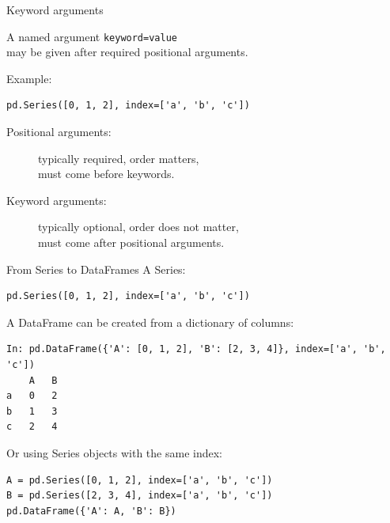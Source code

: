 \documentclass[aspectratio=169,usenames,dvipsnames]{beamer}
\begin{document}
\begin{frame}[fragile]{Keyword arguments}
    \begin{definition}
        A named  argument \texttt{keyword=value} \\
        may be given after required positional arguments.
    \end{definition}

Example:
\begin{lstlisting}
pd.Series([0, 1, 2], index=['a', 'b', 'c'])
\end{lstlisting}
\pause

    \begin{description}
        \item[Positional arguments:]
            typically required, order matters, \\
            must come before keywords.
        \item[Keyword arguments:]
            typically optional, order does not matter,\\
            must come after positional arguments.
    \end{description}
\end{frame}

\begin{frame}[fragile]{From Series to DataFrames}
A Series:
\begin{lstlisting}
pd.Series([0, 1, 2], index=['a', 'b', 'c'])
\end{lstlisting}

\pause
A DataFrame can be created from a dictionary of columns:
\begin{lstlisting}
In: pd.DataFrame({'A': [0, 1, 2], 'B': [2, 3, 4]}, index=['a', 'b', 'c'])
    A   B
a   0   2
b   1   3
c   2   4
\end{lstlisting}

\pause
Or using Series objects with the same index:
\begin{lstlisting}
A = pd.Series([0, 1, 2], index=['a', 'b', 'c'])
B = pd.Series([2, 3, 4], index=['a', 'b', 'c'])
pd.DataFrame({'A': A, 'B': B})
\end{lstlisting}
\end{frame}


\end{document}
